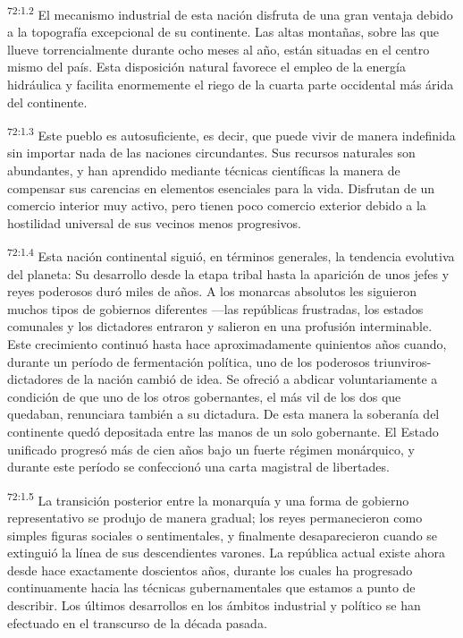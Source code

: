 \documentclass[twoside, 11pt]{book}
\begin{document}
\par
\textsuperscript{72:1.2} El mecanismo industrial de esta nación disfruta de una gran ventaja debido a la topografía excepcional de su continente. Las altas montañas, sobre las que llueve torrencialmente durante ocho meses al año, están situadas en el centro mismo del país. Esta disposición natural favorece el empleo de la energía hidráulica y facilita enormemente el riego de la cuarta parte occidental más árida del continente.

\par
\textsuperscript{72:1.3} Este pueblo es autosuficiente, es decir, que puede vivir de manera indefinida sin importar nada de las naciones circundantes. Sus recursos naturales son abundantes, y han aprendido mediante técnicas científicas la manera de compensar sus carencias en elementos esenciales para la vida. Disfrutan de un comercio interior muy activo, pero tienen poco comercio exterior debido a la hostilidad universal de sus vecinos menos progresivos.

\par
\textsuperscript{72:1.4} Esta nación continental siguió, en términos generales, la tendencia evolutiva del planeta: Su desarrollo desde la etapa tribal hasta la aparición de unos jefes y reyes poderosos duró miles de años. A los monarcas absolutos les siguieron muchos tipos de gobiernos diferentes ---las repúblicas frustradas, los estados comunales y los dictadores entraron y salieron en una profusión interminable. Este crecimiento continuó hasta hace aproximadamente quinientos años cuando, durante un período de fermentación política, uno de los poderosos triunviros-dictadores de la nación cambió de idea. Se ofreció a abdicar voluntariamente a condición de que uno de los otros gobernantes, el más vil de los dos que quedaban, renunciara también a su dictadura. De esta manera la soberanía del continente quedó depositada entre las manos de un solo gobernante. El Estado unificado progresó más de cien años bajo un fuerte régimen monárquico, y durante este período se confeccionó una carta magistral de libertades.

\par
\textsuperscript{72:1.5} La transición posterior entre la monarquía y una forma de gobierno representativo se produjo de manera gradual; los reyes permanecieron como simples figuras sociales o sentimentales, y finalmente desaparecieron cuando se extinguió la línea de sus descendientes varones. La república actual existe ahora desde hace exactamente doscientos años, durante los cuales ha progresado continuamente hacia las técnicas gubernamentales que estamos a punto de describir. Los últimos desarrollos en los ámbitos industrial y político se han efectuado en el transcurso de la década pasada.
\end{document}
